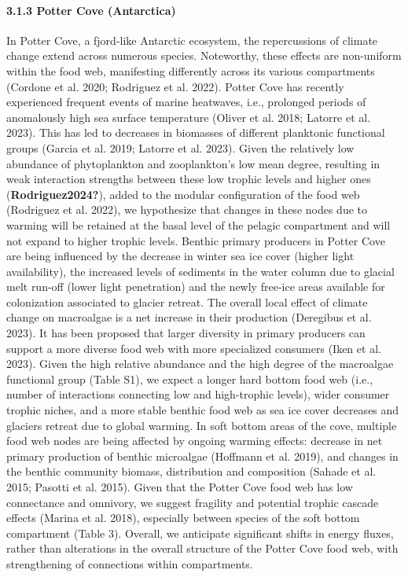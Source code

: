\documentclass[
]{article}
\begin{document}
\paragraph{3.1.3 Potter Cove
(Antarctica)}\label{potter-cove-antarctica-1}

In Potter Cove, a fjord-like Antarctic ecosystem, the repercussions of
climate change extend across numerous species. Noteworthy, these effects
are non-uniform within the food web, manifesting differently across its
various compartments (Cordone et al. 2020; Rodriguez et al. 2022).
Potter Cove has recently experienced frequent events of marine
heatwaves, i.e., prolonged periods of anomalously high sea surface
temperature (Oliver et al. 2018; Latorre et al. 2023). This has led to
decreases in biomasses of different planktonic functional groups (Garcia
et al. 2019; Latorre et al. 2023). Given the relatively low abundance of
phytoplankton and zooplankton's low mean degree, resulting in weak
interaction strengths between these low trophic levels and higher ones
(\textbf{Rodriguez2024?}), added to the modular configuration of the
food web (Rodriguez et al. 2022), we hypothesize that changes in these
nodes due to warming will be retained at the basal level of the pelagic
compartment and will not expand to higher trophic levels. Benthic
primary producers in Potter Cove are being influenced by the decrease in
winter sea ice cover (higher light availability), the increased levels
of sediments in the water column due to glacial melt run-off (lower
light penetration) and the newly free-ice areas available for
colonization associated to glacier retreat. The overall local effect of
climate change on macroalgae is a net increase in their production
(Deregibus et al. 2023). It has been proposed that larger diversity in
primary producers can support a more diverse food web with more
specialized consumers (Iken et al. 2023). Given the high relative
abundance and the high degree of the macroalgae functional group (Table
S1), we expect a longer hard bottom food web (i.e., number of
interactions connecting low and high-trophic levels), wider consumer
trophic niches, and a more stable benthic food web as sea ice cover
decreases and glaciers retreat due to global warming. In soft bottom
areas of the cove, multiple food web nodes are being affected by ongoing
warming effects: decrease in net primary production of benthic
microalgae (Hoffmann et al. 2019), and changes in the benthic community
biomass, distribution and composition (Sahade et al. 2015; Pasotti et
al. 2015). Given that the Potter Cove food web has low connectance and
omnivory, we suggest fragility and potential trophic cascade effects
(Marina et al. 2018), especially between species of the soft bottom
compartment (Table 3). Overall, we anticipate significant shifts in
energy fluxes, rather than alterations in the overall structure of the
Potter Cove food web, with strengthening of connections within
compartments.
\end{document}
